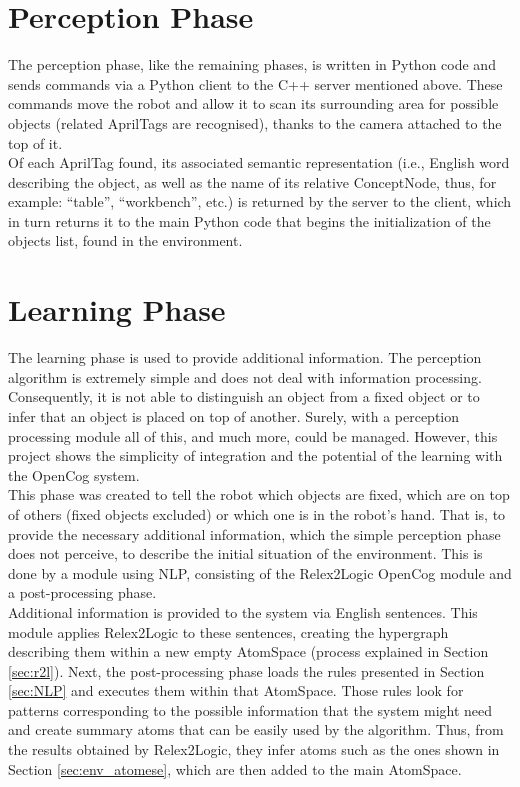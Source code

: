 \section{Perception Phase}\label{sec:perception}

The perception phase, like the remaining phases, is written in Python code and sends commands via a Python client to the C++ server mentioned above. These commands move the robot and allow it to scan its surrounding area for possible objects (related AprilTags are recognised), thanks to the camera attached to the top of it. \\
Of each AprilTag found, its associated semantic representation (i.e., English word describing the object, as well as the name of its relative ConceptNode, thus, for example: \enquote{table}, \enquote{workbench}, etc.) is returned by the server to the client, which in turn returns it to the main Python code that begins the initialization of the objects list, found in the environment.

\section{Learning Phase}\label{sec:learning}

The learning phase is used to provide additional information. 
The perception algorithm is extremely simple and does not deal with information processing. Consequently, it is not able to distinguish an object from a fixed object or to infer that an object is placed on top of another. Surely, with a perception processing module all of this, and much more, could be managed. 
However, this project shows the simplicity of integration and the potential of the learning with the OpenCog system. \\

This phase was created to tell the robot which objects are fixed, which are on top of others (fixed objects excluded) or which one is in the robot's hand. That is, to provide the necessary additional information, which the simple perception phase does not perceive, to describe the initial situation of the environment.
This is done by a module using NLP, consisting of the Relex2Logic OpenCog module and a post-processing phase. \\

Additional information is provided to the system via English sentences. 
This module applies Relex2Logic to these sentences, creating the hypergraph describing them within a new empty AtomSpace (process explained in Section \ref{sec:r2l}).  
Next, the post-processing phase loads the rules presented in Section \ref{sec:NLP} and executes them within that AtomSpace. Those rules look for patterns corresponding to the possible information that the system might need and create summary atoms that can be easily used by the algorithm. Thus, from the results obtained by Relex2Logic, they infer atoms such as the ones shown in Section \ref{sec:env_atomese}, which are then added to the main AtomSpace. \\

